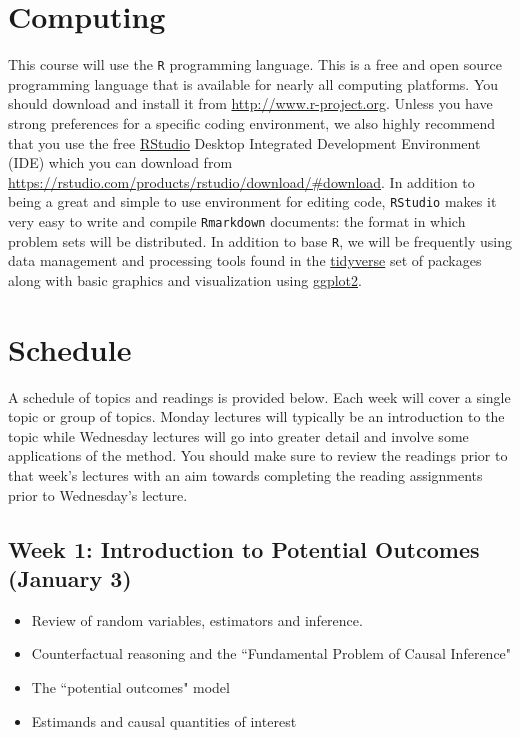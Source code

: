 \documentclass[11pt, article, oneside]{memoir}
\theoremstyle{Assumption}
\begin{document}
\section*{Computing}

This course will use the \texttt{R} programming language. This is a free and open source programming language that is available for nearly all computing platforms. You should download and install it from \url{http://www.r-project.org}. Unless you have strong preferences for a specific coding environment, we also highly recommend that you use the free \href{https://rstudio.com}{RStudio} Desktop Integrated Development Environment (IDE) which you can download from \url{https://rstudio.com/products/rstudio/download/#download}. In addition to being a great and simple to use environment for editing code, \texttt{RStudio} makes it very easy to write and compile \texttt{Rmarkdown} documents: the format in which problem sets will be distributed. In addition to base \texttt{R}, we will be frequently using data management and processing tools found in the \href{https://www.tidyverse.org/}{tidyverse} set of packages along with basic graphics and visualization using \href{https://ggplot2.tidyverse.org/}{ggplot2}. 


\section*{Schedule}

A schedule of topics and readings is provided below. Each week will cover a single topic or group of topics. Monday lectures will typically be an introduction to the topic while Wednesday lectures will go into greater detail and involve some applications of the method. You should make sure to review the readings prior to that week's lectures with an aim towards completing the reading assignments prior to Wednesday's lecture.

\subsection{Week 1: Introduction to Potential Outcomes (January 3)}

\begin{itemize}
  \item Review of random variables, estimators and inference.
  \item Counterfactual reasoning and the ``Fundamental Problem of Causal Inference"
  \item The ``potential outcomes" model
  \item Estimands and causal quantities of interest
\end{itemize}
\end{document}
